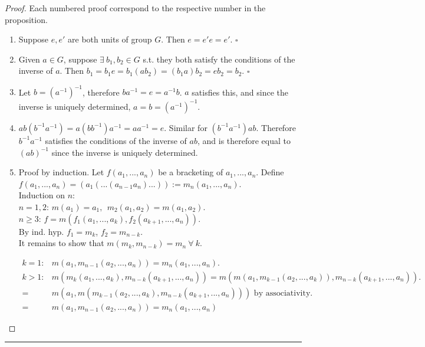 \documentclass{article}
\theoremstyle{definition}
\theoremstyle{remark}
\begin{document}
\begin{proof} Each numbered proof correspond to the respective number in the proposition.
	\begin{enumerate}
		\item Suppose $e, e\prime$ are both units of group $G$. Then $e=e' e = e'$. $\square$
		\item Given $a \in G$, suppose $\exists~ b_1,b_2 \in G$ s.t. they both satisfy the conditions of the inverse of $a$. Then $b_1=b_1 e = b_1(ab_2)=(b_1a)b_2=eb_2=b_2$. $\square$
		\item Let $b=(a^{-1})^{-1}$, therefore $ba^{-1}=e=a^{-1} b$. $a$ satisfies this, and since the inverse is uniquely determined, $a=b=(a^{-1})^{-1}$.
		\item $ ab(b^{-1}a^{-1})=a(bb^{-1})a^{-1}=aa^{-1}=e$. Similar for $(b^{-1}a^{-1})ab$. Therefore $b^{-1}a^{-1} $ satisfies the conditions of the inverse of $ab$, and is therefore equal to $(ab)^{-1}$ since the inverse is uniquely determined.
		\item Proof by induction. Let $f(a_1,...,a_n)$ be a bracketing of $a_1,...,a_n$. Define $f(a_1,...,a_n)=(a_1(...(a_{n-1}a_n)...)):=m_n(a_1,...,a_n)$.
		      \vspace{2mm}\\
		      Induction on $n$:\\ $n=1,2$: $m(a_1)=a_1,~~m_2(a_1,a_2)=m(a_1,a_2)$.\\$n\geq 3$: $f=m(f_1(a_1,...,a_k),f_2(a_{k+1},...,a_n))$.\\
			      By ind. hyp. $f_1=m_k$, $f_2=m_{n-k}$.\\
			      It remains to show that $m(m_k,m_{n-k})=m_n~\forall~ k$.

		      \begin{align*}
			      k=1:   & m(a_1,m_{n-1}(a_2,...,a_n))=m_n(a_1,...,a_n).                                                         \\
			      k > 1: & m(m_k(a_1,...,a_k),m_{n-k}(a_{k+1},...,a_n))=m(m(a_1,m_{k-1}(a_2,...,a_k)),m_{n-k}(a_{k+1},...,a_n)). \\ =&m(a_1,m(m_{k-1}(a_2,...,a_k),m_{n-k}(a_{k+1},...,a_n))) \text{ by associativity.}\\
			      =      & m(a_1,m_{n-1}(a_2,...,a_n))=m_n(a_1,...,a_n)
		      \end{align*}
	\end{enumerate}
\end{proof}
\hrule
\end{document}
